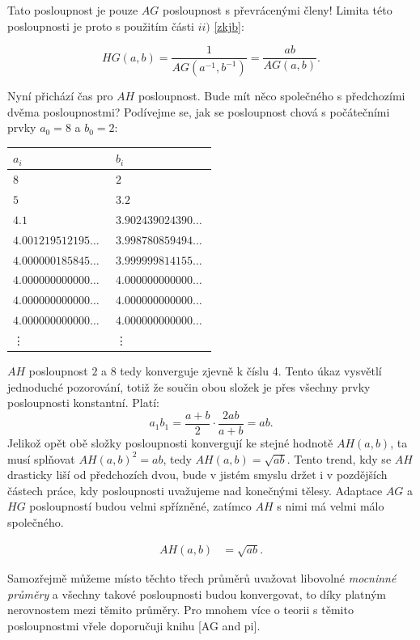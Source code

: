 \documentclass[12pt]{report}
\begin{document}
Tato posloupnost je pouze $AG$ posloupnost s převrácenými členy! Limita této posloupnosti je proto s použitím části $ii)$ \ref{zkjb}:
\begin{veta}
$$HG(a,b) = \frac{1}{AG(a^{-1},b^{-1})} = \frac{ab}{AG(a,b)}.$$
\end{veta}

Nyní přichází čas pro $AH$ posloupnost. Bude mít něco společného s předchozími dvěma posloupnostmi? Podívejme se, jak se posloupnost chová s počátečními prvky $a_0 = 8$ a $b_0 = 2$:

\begin{longtable}[H]{>{\raggedright\arraybackslash}p{0.3\linewidth}p{0.202\linewidth}}
\toprule
$a_i$ & $b_i$\\
\midrule
$8$ & \noindent $2$\\
$5$ & \noindent $3.2$\\
$4.1$ & $3.902439024390\dots$\\
$4.001219512195\dots$ & $3.998780859494\dots$\\ 
$4.000000185845\dots$ & $3.999999814155\dots$\\
$4.000000000000\dots$ & $4.000000000000\dots$\\
$4.000000000000\dots$ & $4.000000000000\dots$\\
$4.000000000000\dots$ & $4.000000000000\dots$\\
\vdots & \vdots\\
\bottomrule 
\end{longtable} 

$AH$ posloupnost $2$ a $8$ tedy konverguje zjevně k číslu $4$. Tento úkaz vysvětlí jednoduché pozorování, totiž že součin obou složek je přes všechny prvky posloupnosti konstantní. Platí:
$$a_1  b_1 = \frac{a+b}{2} \cdot \frac{2ab}{a+b} = ab.$$
Jelikož opět obě složky posloupnosti konvergují ke stejné hodnotě $AH(a,b)$, ta musí splňovat $AH (a,b)^2 = ab$, tedy $AH(a,b) = \sqrt{ab}$. Tento trend, kdy se $AH$ drasticky liší od předchozích dvou, bude v jistém smyslu držet i v pozdějších částech práce, kdy posloupnosti uvažujeme nad konečnými tělesy. Adaptace $AG$ a $HG$ posloupností budou velmi spřízněné, zatímco $AH$ s nimi má velmi málo společného.

\begin{veta}
\begin{align*}
AH(a,b) &= \sqrt{ab}.
\end{align*}
\end{veta}

Samozřejmě můžeme místo těchto třech průměrů uvažovat libovolné \textit{mocninné průměry} a všechny takové posloupnosti budou konvergovat, to díky platným nerovnostem mezi těmito průměry. Pro mnohem více o teorii s těmito posloupnostmi vřele doporučuji knihu [AG and pi].
\end{document}
